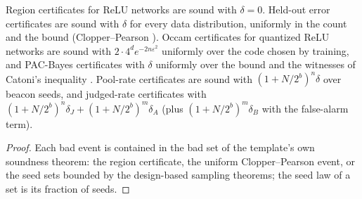 \begin{theorem}\label{thm:spec_instances}
\leanok
{}
Region certificates for ReLU networks are sound with $\delta = 0$. Held-out error certificates are
sound with $\delta$ for every data distribution, uniformly in the count and the bound
(Clopper--Pearson \cite{clopper1934use}). Occam certificates for quantized ReLU networks are
sound with $2 \cdot 4^d e^{-2n\varepsilon^2}$ uniformly over the code chosen by training, and
PAC-Bayes certificates with $\delta$ uniformly over the bound and the witnesses of Catoni's
inequality \cite{catoni2007pac}. Pool-rate certificates are sound with
$(1 + N/2^b)^n \delta$ over beacon seeds, and judged-rate certificates with
$(1 + N/2^b)^n \delta_J + (1 + N/2^b)^m \delta_A$ (plus $(1 + N/2^b)^m \delta_B$ with the false-alarm
term).
\end{theorem}
\begin{proof}
\leanok
Each bad event is contained in the bad set of the template's own soundness theorem: the region
certificate, the uniform Clopper--Pearson event, or the seed sets bounded by the design-based
sampling theorems; the seed law of a set is its fraction of seeds.
\end{proof}



